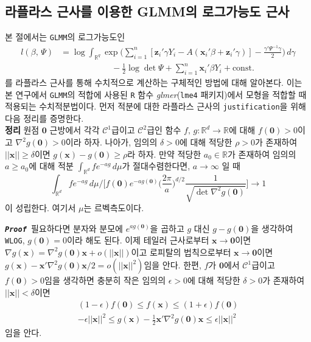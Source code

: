 \documentclass[11pt,onecolumn,twoside,a4size]{gsag3jnl}
\newcommand{\proof}{\texttt{\textit{\textbf{Proof }}}}
\begin{document}
\subsection{라플라스 근사를 이용한 GLMM의 로그가능도 근사}

본 절에서는 \texttt{GLMM}의 로그가능도인 
\begin{align}\label{eq:GLMMloglik}
  l(\beta,\,\Psi)&=\log\int_{\mathbb{R}^q}\exp\bigg(\sum_{i=1}^n[\mathbf{z}_i'\gamma Y_i-A(\mathbf{x}_i'\beta+\mathbf{z}_i'\gamma)]-\frac{\gamma'\Psi^{-1}\gamma}{2}\bigg)\,d\gamma\nonumber\\
  &\qquad\qquad\qquad-\frac{1}{2}\log\det\Psi+\sum_{i=1}^n\mathbf{x}_i'\beta Y_i+\mathrm{const.}
\end{align}
를 라플라스 근사를 통해 수치적으로 계산하는 구체적인 방법에 대해 알아본다. 이는 본 연구에서 \texttt{GLMM}의 적합에 사용된 \texttt{R} 함수 \textit{glmer}(\texttt{lme4} 패키지)에서 모형을 적합할 때 적용되는 수치적분법이다. 먼저 적분에 대한 라플라스 근사의 \texttt{justification}을 위해 다음 정리를 증명한다.\\

\noindent\textsf{\textbf{정리} 원점 $\mathbf{0}$ 근방에서 각각 $\mathcal{C}^1$급이고 $\mathcal{C}^2$급인 함수 $f,\,g:\mathbb{R}^d\to\mathbb{R}$에 대해 $f(\mathbf{0})>0$이고 $\nabla^2g(\mathbf{0})>0$이라 하자. 나아가, 임의의 $\delta>0$에 대해 적당한 $\rho>0$가 존재하여 $||\mathbf{x}||\geq\delta$이면 $g(\mathbf{x})-g(\mathbf{0})\geq\rho$라 하자. 만약 적당한 $a_0\in\mathbb{R}$가 존재하여 임의의 $a\geq a_0$에 대해 적분 $\int_{\mathbb{R}^d}fe^{-ag}\,d\mu$가 절대수렴한다면, $a\to\infty$ 일 때
\begin{equation}
  \int_{\mathbb{R}^d}fe^{-ag}\,d\mu\bigg/\bigg[f(\mathbf{0})e^{-ag(\mathbf{0})}\bigg(\frac{2\pi}{a}\bigg)^{d/2}\frac{1}{\sqrt{\det\nabla^2g(\mathbf{0})}}\bigg]\to1
\end{equation}
이 성립한다. 여기서 $\mu$는 르벡측도이다.}

\proof 필요하다면 분자와 분모에 $e^{ag(\mathbf{0})}$을 곱하고 $g$ 대신 $g-g(\mathbf{0})$을 생각하여 \texttt{WLOG}, $g(\mathbf{0})=0$이라 해도 된다. 이제 테일러 근사로부터 $\mathbf{x}\to\mathbf{0}$이면 $\nabla g(\mathbf{x})=\nabla^2g(\mathbf{0})\mathbf{x}+o(||\mathbf{x}||)$이고 로피탈의 법칙으로부터 $\mathbf{x}\to\mathbf{0}$이면 $g(\mathbf{x})-\mathbf{x}'\nabla^2g(\mathbf{0})\mathbf{x}/2=o(||\mathbf{x}||^2)$임을 안다. 한편, $f$가 $\mathbf{0}$에서 $\mathcal{C}^1$급이고 $f(\mathbf{0})>0$임을 생각하면 충분히 작은 임의의 $\epsilon>0$에 대해 적당한 $\delta>0$가 존재하여 $||\mathbf{x}||<\delta$이면
\begin{align}
  (1-\epsilon)f(\mathbf{0})\leq f(\mathbf{x})\leq(1+\epsilon)f(\mathbf{0})\\
  -\epsilon||\mathbf{x}||^2\leq g(\mathbf{x})-\frac{1}{2}\mathbf{x}'\nabla^2g(\mathbf{0})\mathbf{x}\leq \epsilon ||\mathbf{x}||^2
\end{align}
임을 안다.
\end{document}
